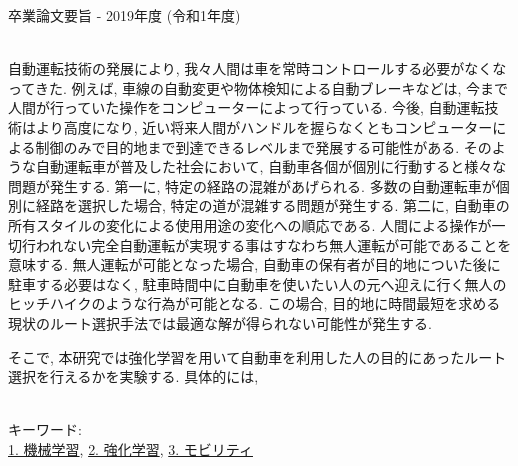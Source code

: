 卒業論文要旨 - 2019年度 (令和1年度)
\begin{center}
\begin{large}
\end{large}
\end{center}

~ \\

自動運転技術の発展により, 我々人間は車を常時コントロールする必要がなくなってきた.
例えば, 車線の自動変更や物体検知による自動ブレーキなどは, 今まで人間が行っていた操作をコンピューターによって行っている.
今後, 自動運転技術はより高度になり, 近い将来人間がハンドルを握らなくともコンピューターによる制御のみで目的地まで到達できるレベルまで発展する可能性がある.
そのような自動運転車が普及した社会において, 自動車各個が個別に行動すると様々な問題が発生する. 第一に, 特定の経路の混雑があげられる.
多数の自動運転車が個別に経路を選択した場合, 特定の道が混雑する問題が発生する.
第二に, 自動車の所有スタイルの変化による使用用途の変化への順応である. 人間による操作が一切行われない完全自動運転が実現する事はすなわち無人運転が可能であることを意味する.
無人運転が可能となった場合, 自動車の保有者が目的地についた後に駐車する必要はなく, 駐車時間中に自動車を使いたい人の元へ迎えに行く無人のヒッチハイクのような行為が可能となる.
この場合, 目的地に時間最短を求める現状のルート選択手法では最適な解が得られない可能性が発生する.

そこで, 本研究では強化学習を用いて自動車を利用した人の目的にあったルート選択を行えるかを実験する. 具体的には, 



~ \\
キーワード:\\
\underline{1. 機械学習},
\underline{2. 強化学習},
\underline{3. モビリティ}
\begin{flushright}
\dept \\
\author
\end{flushright}
